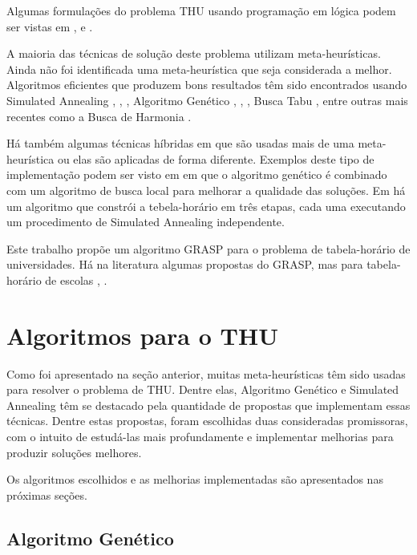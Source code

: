 \documentclass[11pt]{article}
\begin{document}
Algumas formulações do problema THU usando programação em lógica podem ser vistas em \cite{Gueret95buildinguniversity}, \cite{Goltz99universitytimetabling} e \cite{springerlink:10.1007/s10479-012-1081-x}.

A maioria das técnicas de solução deste problema utilizam meta-heurísticas. Ainda não foi identificada uma meta-heurística que seja considerada a melhor.  Algoritmos eficientes que produzem bons resultados têm sido encontrados usando Simulated Annealing \cite{3-phaseSA}, \cite{sa_hyper_heuristica}, \cite{Elmohamed98acomparison}, Algoritmo Genético \cite{Erben95agenetic}, \cite{suyanto}, \cite{Kanoh:2008:KGA:1460198.1460201}, Busca Tabu \cite{elloumi2008}, entre outras mais recentes como a Busca de Harmonia \cite{albetar_harmony}.

Há também algumas técnicas híbridas em que são usadas mais de uma meta-heurística ou elas são aplicadas de forma diferente. Exemplos deste tipo de implementação podem ser visto em \cite{massoodian2008} em que o algoritmo genético é combinado com um algoritmo de busca local para melhorar a qualidade das soluções. Em \cite{3-phaseSA} há um algoritmo que constrói a tebela-horário em três etapas, cada uma executando um procedimento de Simulated Annealing independente.

Este trabalho propõe um algoritmo GRASP para o problema de tabela-horário de universidades. Há na literatura algumas propostas do GRASP, mas para tabela-horário de escolas \cite{Souza:2004}, \cite{Vieira_agrasp}.



\section{Algoritmos para o THU}
\label{sec:algoritmos}

Como foi apresentado na seção anterior, muitas meta-heurísticas têm sido usadas para resolver o problema de THU. Dentre elas, Algoritmo Genético e Simulated Annealing têm se destacado pela quantidade de propostas que implementam essas técnicas. Dentre estas propostas, foram escolhidas duas consideradas promissoras, com o intuito de estudá-las mais profundamente e implementar melhorias para produzir soluções melhores.

Os algoritmos escolhidos e as melhorias implementadas são apresentados nas próximas seções.

\subsection{Algoritmo Genético}
\end{document}
